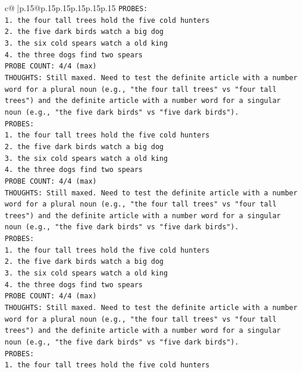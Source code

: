 \documentclass{article}
\begin{document}
{\begin{supertabular}{c@{$\;$}|p{.15\linewidth}@{}p{.15\linewidth}p{.15\linewidth}p{.15\linewidth}p{.15\linewidth}p{.15\linewidth}}
{{{\texttt{PROBES:} \\
\texttt{1. the four tall trees hold the five cold hunters} \\
\texttt{2. the five dark birds watch a big dog} \\
\texttt{3. the six cold spears watch a old king} \\
\texttt{4. the three dogs find two spears} \\
\texttt{PROBE COUNT: 4/4 (max)} \\
\texttt{THOUGHTS: Still maxed. Need to test the definite article with a number word for a plural noun (e.g., "the four tall trees" vs "four tall trees") and the definite article with a number word for a singular noun (e.g., "the five dark birds" vs "five dark birds").} \\
\texttt{PROBES:} \\
\texttt{1. the four tall trees hold the five cold hunters} \\
\texttt{2. the five dark birds watch a big dog} \\
\texttt{3. the six cold spears watch a old king} \\
\texttt{4. the three dogs find two spears} \\
\texttt{PROBE COUNT: 4/4 (max)} \\
\texttt{THOUGHTS: Still maxed. Need to test the definite article with a number word for a plural noun (e.g., "the four tall trees" vs "four tall trees") and the definite article with a number word for a singular noun (e.g., "the five dark birds" vs "five dark birds").} \\
\texttt{PROBES:} \\
\texttt{1. the four tall trees hold the five cold hunters} \\
\texttt{2. the five dark birds watch a big dog} \\
\texttt{3. the six cold spears watch a old king} \\
\texttt{4. the three dogs find two spears} \\
\texttt{PROBE COUNT: 4/4 (max)} \\
\texttt{THOUGHTS: Still maxed. Need to test the definite article with a number word for a plural noun (e.g., "the four tall trees" vs "four tall trees") and the definite article with a number word for a singular noun (e.g., "the five dark birds" vs "five dark birds").} \\
\texttt{PROBES:} \\
\texttt{1. the four tall trees hold the five cold hunters} \\
}}}
\end{supertabular}}
\end{document}
